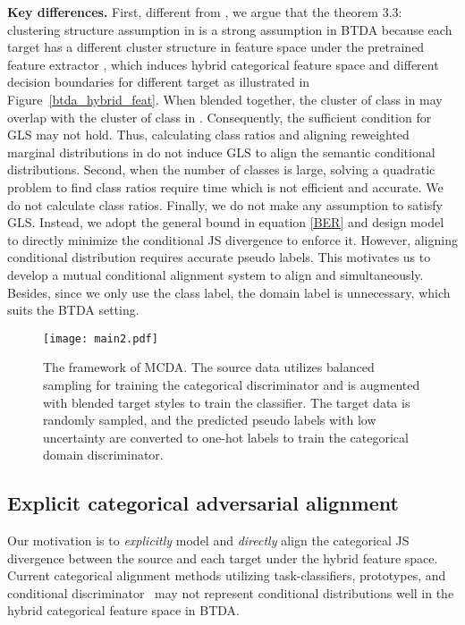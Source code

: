 \documentclass[letterpaper]{article} \usepackage{aaai23}  \usepackage{times}  \usepackage{helvet}  \usepackage{courier}  \usepackage[hyphens]{url}  \usepackage{graphicx} \urlstyle{rm} \def\UrlFont{\rm}  \usepackage{natbib}  \usepackage{caption} \frenchspacing  \setlength{\pdfpagewidth}{8.5in}  \setlength{\pdfpageheight}{11in}
\begin{document}
\noindent\textbf{Key differences.} First, different from \cite{tachet2020domain}, we argue that the theorem 3.3: clustering structure assumption in \cite{tachet2020domain} is a strong assumption in BTDA because each target has a different cluster structure  in feature space under the pretrained feature extractor , which induces hybrid categorical feature space and different decision boundaries for different target  as illustrated in Figure~\ref{btda_hybrid_feat}. When blended together, the cluster of class  in  may overlap with the cluster of class  in . Consequently, the sufficient condition for GLS may not hold. Thus, calculating class ratios and aligning reweighted marginal distributions in \cite{tachet2020domain} do not induce GLS to align the semantic conditional distributions. Second, when the number of classes  is large, solving a quadratic problem to find class ratios require  time which is not efficient and accurate. We do not calculate class ratios. Finally, we do not make any assumption to satisfy GLS. Instead, we adopt the general bound in equation \ref{BER} and design model to directly minimize the conditional JS divergence  to enforce it. However, aligning conditional distribution requires accurate pseudo labels. This motivates us to develop a mutual conditional alignment system to align  and  simultaneously. Besides, since we only use the class label, the domain label is unnecessary, which suits the BTDA setting. 

\begin{figure*}[t] \centering \texttt{[image: main2.pdf]} \caption{The framework of MCDA. The source data utilizes balanced sampling for training the categorical discriminator and is augmented with blended target styles to train the classifier. The target data is randomly sampled, and the predicted pseudo labels with low uncertainty are converted to one-hot labels to train the categorical domain discriminator.} \label{main_fig} \end{figure*}



\subsection{Explicit categorical adversarial alignment}
Our motivation is to \textit{explicitly} model and \textit{directly} align the categorical JS divergence  between the source and each target under the hybrid feature space. Current categorical alignment methods utilizing task-classifiers, prototypes, and conditional discriminator~\cite{zhang2019bridging,saito2019semi,long2018conditional} may not represent conditional distributions well in the hybrid categorical feature space in BTDA.
\end{document}
